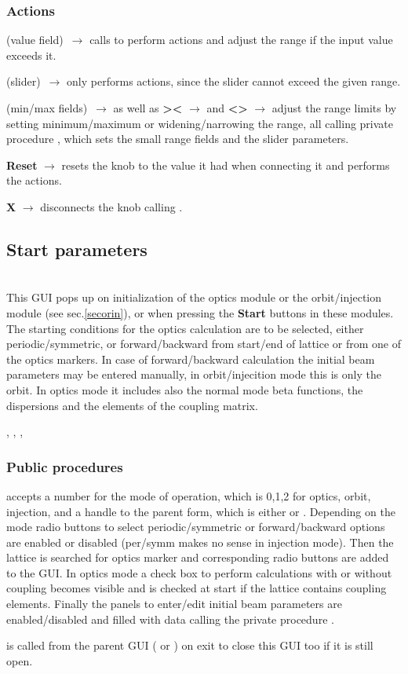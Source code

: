 \documentclass[12pt]{article}
\newcommand\code[1]{{\tt #1}}
\newcommand{\ofld}[1]{\colorbox{black!15}{{\bf #1}}}
\newcommand{\ofldx}[1]{\colorbox{black!15}{(#1)}}
\newcommand\guico[1]{{\color{blue}\code{#1}}}
\newcommand\guifco[1]{{\color{violet}\code{#1}}}
\newcommand{\evcodf}[2]{\ofld{#1} $\rightarrow$ \guifco{#2}}
\newcommand{\evcodxf}[2]{\ofldx{#1}~$\rightarrow$ \guifco{#2}}
\newcommand{\opagui}[1]{\colorbox{blue!20}{{\color{black}\code{#1}}}}
\newcommand{\oguih}[2]{\subsection{\label{#2}#1}{\Huge\opagui{#2}}\\}
\newcommand{\ogui}[1]{\hyperref[#1]{\opagui{#1}}}
\newcommand{\opauni}[1]{\colorbox{orange!30}{{\color{black}\code{#1}}}}
\newcommand{\ouni}[1]{\hyperref[#1]{\opauni{#1}}}
\newcommand{\uses}[1]{\flushleft {\bf Uses:} #1}
\newcommand{\desc}[1]{#1}
\newcommand{\act}[1]{\subsubsection*{Actions} #1}
\newcommand{\ppro}[1]{\subsubsection*{Public procedures} #1}
\begin{document}
\act{
\evcodxf{value field}{editKKeyPress} calls \guifco{KUpdate} to perform actions and adjust the range if the input value exceeds it.

\evcodxf{slider}{sliderScroll} only performs actions, since the slider cannot exceed the given range.

\evcodxf{min/max fields}{editmin/maxKeyPress} as well as \evcodf{\textgreater\textless}{butwidClick} and \evcodf{\textless\textgreater}{butnarClick} adjust the range limits by setting minimum/maximum or widening/narrowing the range, all calling private procedure \guifco{SetKrange}, which sets the small range fields and the slider parameters.

\evcodf{Reset}{butresClick} resets the knob to the value it had when connecting it and performs the actions.

\evcodf{X}{butfreeClick} disconnects the knob calling \guifco{Unload}.
}

\oguih{Start parameters}{ostartmenu} 

\desc{This GUI pops up on initialization of the optics module  \ogui{opalinop} or the orbit/injection module \ogui{opaorbit} (see sec.\ref{secorin}), or when pressing the \ofld{Start} buttons in these modules. The starting conditions for the optics calculation are to be selected, either periodic/symmetric, or forward/backward from start/end of lattice or from one of the optics markers. In case of forward/backward calculation the initial beam parameters may be entered manually, in orbit/injecition mode this is only the orbit. In optics mode it includes also the normal mode beta functions, the dispersions and the elements of the coupling matrix.}

\uses{\ouni{linoplib}, \ouni{globlib}, \ouni{mathlib}, \ouni{../com/asaux}} 

\ppro{
\guico{Load} accepts a number for the mode of operation, which is 0,1,2 for optics, orbit, injection, and a handle to the parent form, which is either \ogui{opalinop} or \ogui{opaorbit}. Depending on the mode radio buttons to select periodic/symmetric or forward/backward options are enabled or disabled (per/symm makes no sense in injection mode). Then the lattice is searched for optics marker and corresponding radio buttons are added to the GUI. In optics mode a check box to perform calculations with or without coupling becomes visible and is checked at start if the lattice contains coupling elements. Finally the panels to enter/edit initial beam parameters are enabled/disabled and filled with data calling the private procedure \guico{set\_pan\_ini}.

\guico{Exit} is called from the parent GUI (\ogui{opalinop} or \ogui{opaorbit}) on exit to close this GUI too if it is still open.
}
\end{document}
